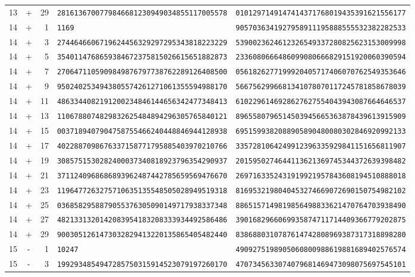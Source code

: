 \begin{longtable}{@{}rcrll@{}}
13&+&29&\texttt{2816136700779846681230949034855117005578}&\texttt{0101297149147414371768019435391621556177}\\
14&+&1&\texttt{1169}&\texttt{9057036341927958911195888555532382282533}\\
14&+&3&\texttt{2744646606719624456329297295343818223229}&\texttt{5390023624612326549337280825623153009998}\\
14&+&5&\texttt{3540114768659384672375815026615651882873}&\texttt{2336080666486099080666829151920060390594}\\
14&+&7&\texttt{2706471105909849876797738762289126408500}&\texttt{0561826277199920405717406070762549353646}\\
14&+&9&\texttt{9502402534943805574261271061355594988170}&\texttt{5667562996681341078070117245781858678039}\\
14&+&11&\texttt{4863344082191200234846144656342477348413}&\texttt{6102296146928627627554043943087664646537}\\
14&+&13&\texttt{1106788074829832625484894296305765840121}&\texttt{8965580796514503945665363878439613915909}\\
14&+&15&\texttt{0037189407904758755466240448846944128938}&\texttt{6951599382088905890480080302846920992133}\\
14&+&17&\texttt{4022887098676337158771795885403970210766}&\texttt{3357281064249912396335929841151656811907}\\
14&+&19&\texttt{3085751530282400037340818923796354290937}&\texttt{2015950274644113621369745344372639398482}\\
14&+&21&\texttt{3711240968686893962487442785659569476670}&\texttt{2697163352431919921957843608194510888018}\\
14&+&23&\texttt{1196477263275710635135548505028949519318}&\texttt{8169532198040453274669072690150754982102}\\
14&+&25&\texttt{0368582958879055376305090149717938337348}&\texttt{8865157149819856498833621470764703938490}\\
14&+&27&\texttt{4821331320142083954183208333934492586486}&\texttt{3901682966069935874711714409366779202875}\\
14&+&29&\texttt{9003051261473032829413220135865405482440}&\texttt{8386880310787614742808969387317318898280}\\
15&-&1&\texttt{10247}&\texttt{4909275198905060800988619881689402576574}\\
15&-&3&\texttt{1992934854947285750315914523079197260170}&\texttt{4707345633074079681469473098075697545101}\\

\end{longtable}

